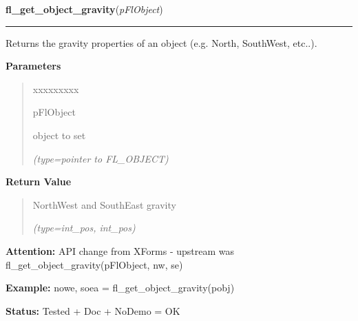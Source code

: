     \label{xformslib:flbasic:fl_get_object_gravity}

    \vspace{0.5ex}

\hspace{.8\funcindent}\begin{boxedminipage}{\funcwidth}

    \raggedright \textbf{fl\_get\_object\_gravity}(\textit{pFlObject})

    \vspace{-1.5ex}

    \rule{\textwidth}{0.5\fboxrule}
\setlength{\parskip}{2ex}
    Returns the gravity properties of an object (e.g. North, SouthWest, 
    etc..).

\setlength{\parskip}{1ex}
      \textbf{Parameters}
      \vspace{-1ex}

      \begin{quote}
        \begin{Ventry}{xxxxxxxxx}

          \item[pFlObject]

          object to set

            {\it (type=pointer to FL\_OBJECT)}

        \end{Ventry}

      \end{quote}

      \textbf{Return Value}
    \vspace{-1ex}

      \begin{quote}
      NorthWest and SouthEast gravity

      {\it (type=int\_pos, int\_pos)}

      \end{quote}

\textbf{Attention:} API change from XForms - upstream was fl\_get\_object\_gravity(pFlObject, 
nw, se)



\textbf{Example:} nowe, soea = fl\_get\_object\_gravity(pobj)



\textbf{Status:} Tested + Doc + NoDemo = OK



    \end{boxedminipage}

